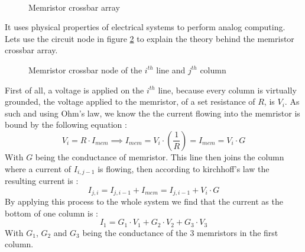 \begin{figure}[H]
  \centering
  \hfill
  \\
  \caption{Memristor crossbar array}
  \label{fig:crossbar}
\end{figure}

It uses physical properties of electrical systems to perform analog computing. Lets use the circuit node in figure \ref{fig:crossNode} to explain the theory behind the memristor crossbar array.
\begin{figure}[H]
  \centering
  
  \caption{Memristor crossbar node of the $i^{th}$ line and $j^{th}$ column}
  \label{fig:crossNode}
\end{figure}

First of all, a voltage is applied on the $i^{th}$ line, because every column is virtually grounded, the voltage applied to the memristor, of a set resistance of $R$, is $V_i$. As such and using Ohm's law, we know the the current flowing into the memristor is bound by the following equation :
\begin{equation}
  V_i = R\cdot I_{mem} \implies I_{mem} = V_i\cdot (\frac{1}{R})=I_{mem} = V_i\cdot G
\end{equation}
With $G$ being the conductance of memristor.
This line then joins the column where a current of $I_{i,j-1}$ is flowing, then according to kirchhoff's law the resulting current is :
\begin{equation}
  I_{j,i} = I_{j,i-1}+I_{mem} = I_{j,i-1} + V_i\cdot G
\end{equation}
By applying this process to the whole system we find that the current as the bottom of one column is :
\begin{equation}
  I_1=G_1\cdot V_1 + G_2\cdot V_2 + G_3\cdot V_3
\end{equation}
With $G_1$, $G_2$ and $G_3$ being the conductance of the 3 memristors in the first column.

